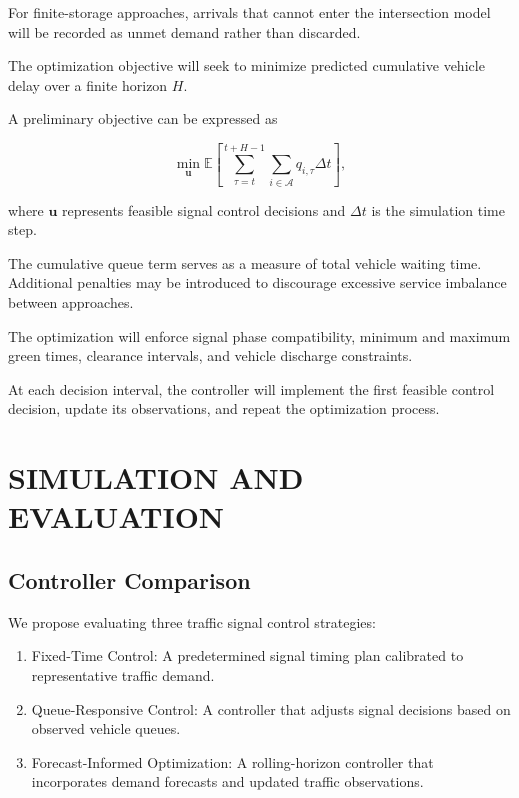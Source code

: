 \documentclass[letterpaper,12pt,conference]{ieeeconf}
\begin{document}
For finite-storage approaches, arrivals that cannot enter
the intersection model will be recorded as unmet demand
rather than discarded.

The optimization objective will seek to minimize predicted
cumulative vehicle delay over a finite horizon $H$.

A preliminary objective can be expressed as

\begin{equation}
\min_{\mathbf{u}}
\mathbb{E}
\left[
\sum_{\tau=t}^{t+H-1}
\sum_{i \in \mathcal{A}}
q_{i,\tau}\Delta t
\right],
\end{equation}

where $\mathbf{u}$ represents feasible signal control decisions
and $\Delta t$ is the simulation time step.

The cumulative queue term serves as a measure of total
vehicle waiting time. Additional penalties may be
introduced to discourage excessive service imbalance
between approaches.

The optimization will enforce signal phase compatibility,
minimum and maximum green times, clearance intervals,
and vehicle discharge constraints.

At each decision interval, the controller will implement
the first feasible control decision, update its observations,
and repeat the optimization process.

\section{SIMULATION AND EVALUATION}

\subsection{Controller Comparison}

We propose evaluating three traffic signal control
strategies:

\begin{enumerate}

    \item Fixed-Time Control:
    A predetermined signal timing plan calibrated to
    representative traffic demand.

    \item Queue-Responsive Control:
    A controller that adjusts signal decisions based
    on observed vehicle queues.

    \item Forecast-Informed Optimization:
    A rolling-horizon controller that incorporates
    demand forecasts and updated traffic
    observations.

\end{enumerate}
\end{document}
